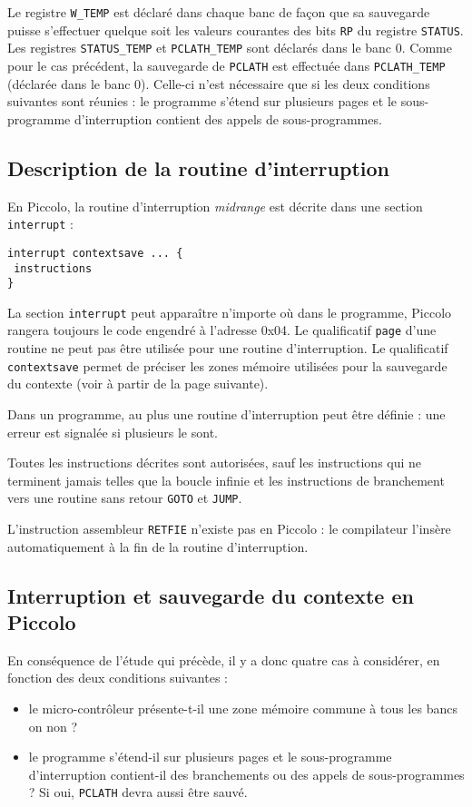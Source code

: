 Le registre \texttt{W\_TEMP} est déclaré dans chaque banc de façon que sa sauvegarde puisse s’effectuer quelque soit les valeurs courantes des bits \texttt{RP} du registre \texttt{STATUS}. Les registres \texttt{STATUS\_TEMP} et \texttt{PCLATH\_TEMP} sont déclarés dans le banc 0. Comme pour le cas précédent, la sauvegarde de \texttt{PCLATH} est effectuée dans \texttt{PCLATH\_TEMP} (déclarée dans le banc 0). Celle-ci n'est nécessaire que si les deux conditions suivantes sont réunies : le programme s’étend sur plusieurs pages et le sous-programme d’interruption contient des appels de sous-programmes.

\subsection{Description de la routine d'interruption}


En Piccolo, la routine d’interruption \emph{midrange} est décrite dans une section \texttt{interrupt} :

\begin{lstlisting}[language=piccolo]
interrupt contextsave ... {
 instructions
}
\end{lstlisting}

La section \texttt{interrupt} peut apparaître n’importe où dans le programme, Piccolo rangera toujours le code engendré à l’adresse 0x04. Le qualificatif \texttt{page} d’une routine ne peut pas être utilisée pour une routine d’interruption. Le qualificatif \texttt{contextsave} permet de préciser les zones mémoire utilisées pour la sauvegarde du contexte (voir à partir de la page suivante).

Dans un programme, au plus une routine d’interruption peut être définie : une erreur est signalée si plusieurs le sont.

Toutes les instructions décrites sont autorisées, sauf les instructions qui ne terminent jamais telles que la boucle infinie et les instructions de branchement vers une routine sans retour \texttt{GOTO} et \texttt{JUMP}.

L’instruction assembleur \texttt{RETFIE} n’existe pas en Piccolo : le compilateur l’insère automatiquement à la fin de la routine d’interruption.

\subsection{Interruption et sauvegarde du contexte en Piccolo}

En conséquence de l'étude qui précède, il y a donc quatre cas à considérer, en fonction des deux conditions suivantes :
\begin{itemize}
  \item le micro-contrôleur présente-t-il une zone mémoire commune à tous les bancs on non ?
  \item le programme s’étend-il sur plusieurs pages et le sous-programme d’interruption contient-il des branchements ou des appels de sous-programmes ? Si oui, \texttt{PCLATH} devra aussi être sauvé.
\end{itemize}


